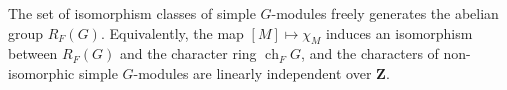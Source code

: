 The set of isomorphism classes of simple $G$-modules freely generates the abelian group $R_F(G)$. Equivalently, the map $[M] \mapsto \chi_M$ induces an isomorphism between $R_F(G)$ and the character ring $\operatorname{ch}_F G$, and the characters of non-isomorphic simple $G$-modules are linearly independent over $\mathbf{Z}$.
